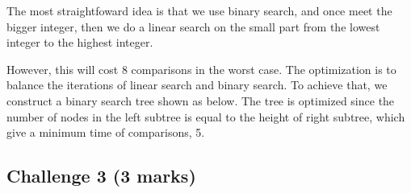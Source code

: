 \documentclass[11pt]{article}
\begin{document}
The most straightfoward idea is that we use binary search,
and once meet the bigger integer,
then we do a linear search on the small part from the lowest integer to the highest integer.

However, this will cost 8 comparisons in the worst case.
The optimization is to balance the iterations of linear search and binary search.
To achieve that, we construct a binary search tree shown as below.
The tree is optimized since the number of nodes in the left subtree is equal to
the height of right subtree, which give a minimum time of comparisons, 5.
\begin{center}
\end{center}


\pagebreak
\subsection*{Challenge 3 \hfill {\small (3 marks)}}
\end{document}
